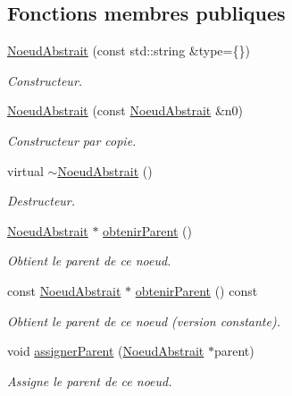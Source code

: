 \subsection*{Fonctions membres publiques}
\begin{DoxyCompactItemize}
\item 
\hyperlink{group__inf2990_gad1eae42fe2bccef56f55b8a52726657f}{Noeud\-Abstrait} (const std\-::string \&type=\{\})
\begin{DoxyCompactList}\small\item\em Constructeur. \end{DoxyCompactList}\item 
\hyperlink{group__inf2990_gae7bea8d23c4dad60c334fc6806d08d01}{Noeud\-Abstrait} (const \hyperlink{class_noeud_abstrait}{Noeud\-Abstrait} \&n0)
\begin{DoxyCompactList}\small\item\em Constructeur par copie. \end{DoxyCompactList}\item 
virtual \hyperlink{group__inf2990_ga0ab3f7ab838e8349113da5074abcdc3a}{$\sim$\-Noeud\-Abstrait} ()
\begin{DoxyCompactList}\small\item\em Destructeur. \end{DoxyCompactList}\item 
\hyperlink{class_noeud_abstrait}{Noeud\-Abstrait} $\ast$ \hyperlink{group__inf2990_gaa2ac8c4cd02d88c312b92c65e07ed6d9}{obtenir\-Parent} ()
\begin{DoxyCompactList}\small\item\em Obtient le parent de ce noeud. \end{DoxyCompactList}\item 
const \hyperlink{class_noeud_abstrait}{Noeud\-Abstrait} $\ast$ \hyperlink{group__inf2990_gaf063d208bc4764b1fd2c4e76ec0469b9}{obtenir\-Parent} () const 
\begin{DoxyCompactList}\small\item\em Obtient le parent de ce noeud (version constante). \end{DoxyCompactList}\item 
void \hyperlink{group__inf2990_ga7787ab59ecc1e6119287459a7154f307}{assigner\-Parent} (\hyperlink{class_noeud_abstrait}{Noeud\-Abstrait} $\ast$parent)
\begin{DoxyCompactList}\small\item\em Assigne le parent de ce noeud. \end{DoxyCompactList}\item 

\end{DoxyCompactItemize}
